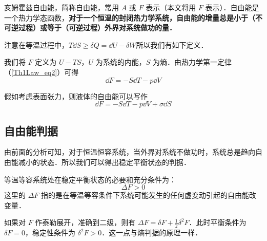 

亥姆霍兹自由能，简称自由能，常用 $A$ 或 $F$ 表示（本文将用 $F$ 表示）．自由能是一个热力学态函数，\textbf{对于一个恒温的封闭热力学系统，自由能的增量总是小于（不可逆过程）或等于（可逆过程）外界对系统做功的量．}

注意在等温过程中，$T\dd S\ge \delta Q=\dd U-\delta W$所以我们有如下定义．

我们将 $F$ 定义为 $U-TS$，$U$ 为系统的内能，$S$ 为熵．由热力学第一定律（\autoref{Th1Law_eq2}）可得
\begin{equation}
\dd F=-S\dd T-p\dd V
\end{equation}

假如考虑表面张力，则液体的自由能可以写作
\begin{equation}
\dd F=-S\dd T-p \dd V+\sigma \dd S
\end{equation}
\subsection{自由能判据}
由前面的分析可知，对于恒温恒容系统，当外界对系统不做功时，系统总是趋向自由能减小的状态．所以我们可以得出稳定平衡状态的判据．

等温等容系统处在稳定平衡状态的必要和充分条件为：
\begin{equation}
\Delta F>0
\end{equation}
这里的 $\Delta F$ 指的是在等温等容条件下系统可能发生的任何虚变动引起的自由能改变量．

如果对 $F$ 作泰勒展开，准确到二级，则有 $\Delta F=\delta F+\frac{1}{2}\delta^2 F$．此时平衡条件为 $\delta F=0$，稳定性条件为 $\delta^2 F>0$．这一点与熵判据的原理一样．